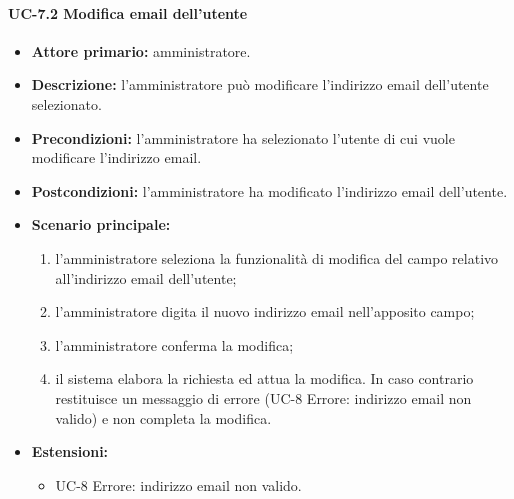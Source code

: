     \paragraph{UC-7.2 Modifica email dell'utente}
    \begin{itemize}
        \item \textbf{Attore primario:} amministratore.
    
        \item \textbf{Descrizione:} l'amministratore può modificare l'indirizzo email dell'utente selezionato.
        
        \item \textbf{Precondizioni:} l'amministratore ha selezionato l'utente di cui vuole modificare l'indirizzo email.
    
        \item \textbf{Postcondizioni:} l'amministratore ha modificato l'indirizzo email dell'utente.
    
        \item \textbf{Scenario principale:}
        \begin{enumerate}
            \item  l'amministratore seleziona la funzionalità di modifica del campo relativo all'indirizzo email dell'utente;
            \item l'amministratore digita il nuovo indirizzo email nell'apposito campo;
            \item l'amministratore conferma la modifica;
            \item il sistema elabora la richiesta ed attua la modifica. In caso contrario restituisce un messaggio di errore (UC-8 Errore: indirizzo email non valido) e non completa la modifica.
        \end{enumerate}
        \item \textbf{Estensioni:}
              \begin{itemize}
                    \item UC-8 Errore: indirizzo email non valido.
            \end{itemize}
    \end{itemize}


